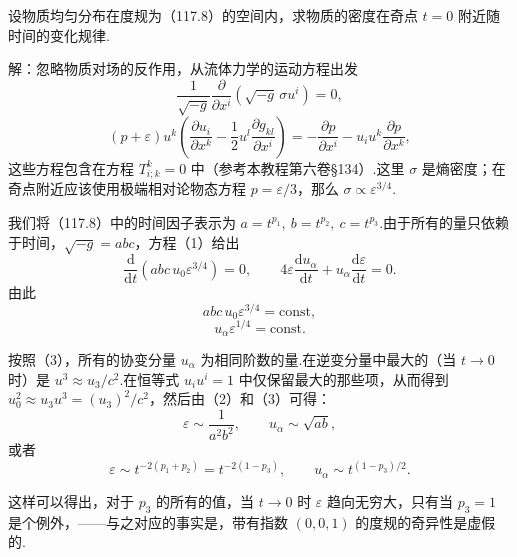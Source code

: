 \begin{xiti}
\quad 设物质均匀分布在度规为（117.8）的空间内，求物质的密度在奇点 $t=0$ 附近随时间的变化规律.

解：忽略物质对场的反作用，从流体力学的运动方程出发
\begin{equation*}
  \frac{1}{\sqrt{-g}}\frac{\partial}{\partial x^{i}}
  (\sqrt{-g}\,\sigma u^{i})=0,
\end{equation*}
\begin{equation}\tag{1}
  (p+\varepsilon)u^{k}
  \left(\frac{\partial u_{i}}{\partial x^{k}}
  -\frac{1}{2}u^{l}\frac{\partial g_{kl}}{\partial x^{i}}\right)
  =-\frac{\partial p}{\partial x^{i}}
  -u_{i}u^{k}\frac{\partial p}{\partial x^{k}},
\end{equation}
这些方程包含在方程 $T_{i;k}^{k}=0$ 中（参考本教程第六卷§134）.这里 $\sigma$ 是熵密度；在奇点附近应该使用极端相对论物态方程 $p=\varepsilon/3$，那么 $\sigma\propto\varepsilon^{3/4}$.

我们将（117.8）中的时间因子表示为 $a=t^{p_{1}},\ b=t^{p_{2}},\ c=t^{p_{3}}$.由于所有的量只依赖于时间，$\sqrt{-g}=abc$，方程（1）给出
\begin{equation*}
  \frac{\mathrm{d}}{\mathrm{d}t}(abc\,u_{0}\varepsilon^{3/4})=0,
  \qquad
  4\varepsilon\frac{\mathrm{d}u_{\alpha}}{\mathrm{d}t}
  +u_{\alpha}\frac{\mathrm{d}\varepsilon}{\mathrm{d}t}=0.
\end{equation*}
由此
\begin{equation}\tag{2}
  abc\,u_{0}\varepsilon^{3/4}=\mathrm{const},
\end{equation}
\begin{equation}\tag{3}
  u_{\alpha}\varepsilon^{1/4}=\mathrm{const}.
\end{equation}

按照（3），所有的协变分量 $u_{\alpha}$ 为相同阶数的量.在逆变分量中最大的（当 $t\to0$ 时）是 $u^{3}\approx u_{3}/c^{2}$.在恒等式 $u_{i}u^{i}=1$ 中仅保留最大的那些项，从而得到 $u_{0}^{2}\approx u_{3}u^{3}=(u_{3})^{2}/c^{2}$，然后由（2）和（3）可得：
\begin{equation*}
  \varepsilon\sim\frac{1}{a^{2}b^{2}},\qquad
  u_{\alpha}\sim\sqrt{ab},
\end{equation*}
或者
\begin{equation}\tag{4}
  \varepsilon\sim t^{-2(p_{1}+p_{2})}=t^{-2(1-p_{3})},\qquad
  u_{\alpha}\sim t^{(1-p_{3})/2}.
\end{equation}

这样可以得出，对于 $p_{3}$ 的所有的值，当 $t\to0$ 时 $\varepsilon$ 趋向无穷大，只有当 $p_{3}=1$ 是个例外，——与之对应的事实是，带有指数 $(0,0,1)$ 的度规的奇异性是虚假的.


\end{xiti}
